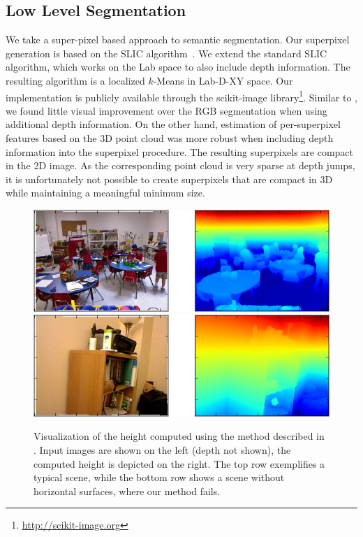 \documentclass[a4paper, 10pt, conference]{ieeeconf}      %
\begin{document}
\subsection{Low Level Segmentation}
We take a super-pixel based approach to semantic segmentation.
Our superpixel generation is based on the SLIC algorithm~\citep{achanta2012slic}. We extend the
standard SLIC algorithm, which works on the Lab space to also include 
depth information. The resulting algorithm is a localized $k$-Means in Lab-D-XY space.
Our implementation is publicly available through the scikit-image library\footnote{\url{http://scikit-image.org}}.
Similar to \citet{SilbermanECCV12}, we found little visual improvement over the
RGB segmentation when using additional depth information. On the other hand,
estimation of per-superpixel features based on the 3D point cloud was more
robust when including depth information into the superpixel procedure.
The resulting superpixels are compact in the 2D image. As the corresponding point
cloud is very sparse at depth jumps, it is unfortunately not possible to create
superpixels that are compact in 3D while maintaining a meaningful minimum size.

\begin{figure}
    \begin{center}
        \includegraphics[width=\linewidth]{images/height_success}\\
        \vspace{3mm}
        \includegraphics[width=\linewidth]{images/height_failure}
    \end{center}
    \caption{%
        Visualization of the height computed using the method described in .
        Input images are shown on the left (depth not shown), the computed height is depicted on the right.
        The top row exemplifies a typical scene, while the bottom row shows a scene without horizontal
        surfaces, where our method fails.
    }
\end{figure}
\end{document}
